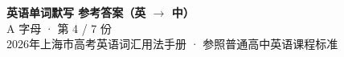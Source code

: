 \documentclass[10pt,a4paper]{article}
\begin{document}
\pagestyle{plain}

\begin{center}
{\LARGE\bfseries 英语单词默写 \quad 参考答案（英 $\to$ 中）}\\[0.22em]
{\large A 字母 · 第 4 / 7 份}\\[0.18em]
{\small 2026年上海市高考英语词汇用法手册 · 参照普通高中英语课程标准}
\end{center}

\vspace{0.2em}
\noindent{\color{rulegray}\rule{\textwidth}{0.8pt}}

\vspace{0.35em}

\vspace{0.25em}
\renewcommand{\arraystretch}{1.32}
\end{document}
